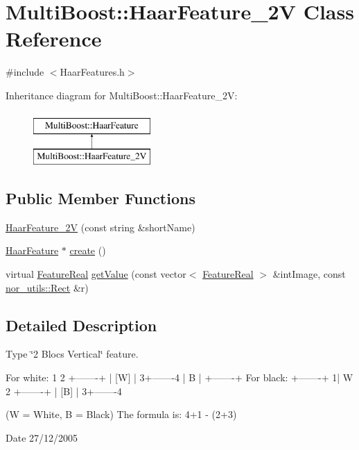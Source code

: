 \hypertarget{classMultiBoost_1_1HaarFeature__2V}{
\section{MultiBoost::HaarFeature\_\-2V Class Reference}
\label{classMultiBoost_1_1HaarFeature__2V}
}


{\ttfamily \#include $<$HaarFeatures.h$>$}

Inheritance diagram for MultiBoost::HaarFeature\_\-2V:\begin{figure}[H]
\begin{center}
\leavevmode
\includegraphics[height=2.000000cm]{classMultiBoost_1_1HaarFeature__2V}
\end{center}
\end{figure}
\subsection*{Public Member Functions}
\begin{DoxyCompactItemize}
\item 
\hyperlink{classMultiBoost_1_1HaarFeature__2V_a999bffdd7fefadf1aecba1a30a349f8c}{HaarFeature\_\-2V} (const string \&shortName)
\item 
\hyperlink{classMultiBoost_1_1HaarFeature}{HaarFeature} $\ast$ \hyperlink{classMultiBoost_1_1HaarFeature__2V_add1de832e33d9d4e0d6c603977519718}{create} ()
\item 
virtual \hyperlink{Defaults_8h_a3a11cfe6a5d469d921716ca6291e934f}{FeatureReal} \hyperlink{classMultiBoost_1_1HaarFeature__2V_a9eba356a09223003b106d05d0e35cda4}{getValue} (const vector$<$ \hyperlink{Defaults_8h_a3a11cfe6a5d469d921716ca6291e934f}{FeatureReal} $>$ \&intImage, const \hyperlink{structnor__utils_1_1Rect}{nor\_\-utils::Rect} \&r)
\end{DoxyCompactItemize}


\subsection{Detailed Description}
Type \char`\"{}2 Blocs Vertical\char`\"{} feature. \begin{DoxyVerb}
	 For white:
	 1        2
	 +-------+
	 |  [W]  |
	 3+-------4
	 |   B   |
	 +-------+
	 For black:
	 +-------+
	 1|   W   2
	 +-------+
	 |  [B]  |
	 3+-------4
	 \end{DoxyVerb}
 (W = White, B = Black) The formula is: 4+1 -\/ (2+3) \begin{DoxyDate}{Date}
27/12/2005 
\end{DoxyDate}


